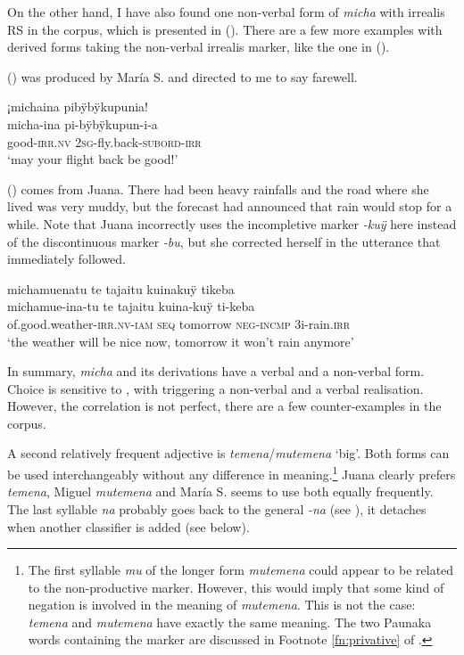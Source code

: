 On the other hand, I have also found one non-verbal form of \textit{micha} with irrealis RS in the corpus, which is presented in (). There are a few more examples with derived forms taking the non-verbal irrealis marker, like the one in ().

() was produced by María S. and directed to me to say farewell.

\ea\label{ex:ADJ-micha-IRR-2}
\begingl
\glpreamble ¡michaina pibÿbÿkupunia!\\
\gla micha-ina pi-bÿbÿkupun-i-a\\
\glb good-\textsc{irr.nv} 2\textsc{sg}-fly.back-\textsc{subord}-\textsc{irr}\\
\glft ‘may your flight back be good!’
\endgl
\trailingcitation{[rxx-e120511l.204]}
\xe

() comes from Juana. There had been heavy rainfalls and the road where she lived was very muddy, but the forecast had announced that rain would stop for a while. Note that Juana incorrectly uses the incompletive marker \textit{-kuÿ} here instead of the discontinuous marker \textit{-bu}, but she corrected herself in the utterance that immediately followed.

\ea\label{ex:goodweather-1}
\begingl
\glpreamble michamuenatu te tajaitu kuinakuÿ tikeba\\
\gla michamue-ina-tu te tajaitu kuina-kuÿ ti-keba\\
\glb of.good.weather-\textsc{irr.nv}-\textsc{iam} \textsc{seq} tomorrow \textsc{neg}-\textsc{incmp} 3i-rain.\textsc{irr}\\
\glft ‘the weather will be nice now, tomorrow it won’t rain anymore’
\endgl
\trailingcitation{[jxx-p120515l-2.269]}
\xe

In summary, \textit{micha} and its derivations have a verbal and a non-verbal form. Choice is sensitive to , with  triggering a non-verbal and  a verbal realisation. However, the correlation is not perfect, there are a few counter-examples in the corpus.

A second relatively frequent adjective is \textit{temena}/\textit{mutemena} ‘big’. Both forms can be used interchangeably without any difference in meaning.\footnote{The first syllable \textit{mu} of the longer form \textit{mutemena} could appear to be related to the non-productive  marker. However, this would imply that some kind of negation is involved in the meaning of \textit{mutemena}. This is not the case: \textit{temena} and \textit{mutemena} have exactly the same meaning. The two Paunaka words containing the  marker are discussed in Footnote \ref{fn:privative} of .} Juana clearly prefers \textit{temena}, Miguel \textit{mutemena} and María S. seems to use both equally frequently. The last syllable \textit{na} probably goes back to the general  \textit{-na} (see ), it detaches when another classifier is added (see below).


